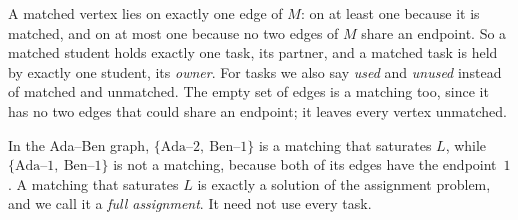 A matched vertex lies on exactly one edge of $M$: on at least one because it is matched, and on at most one because no two edges of $M$ share an endpoint. So a matched student holds exactly one task, its partner, and a matched task is held by exactly one student, its \emph{owner}. For tasks we also say \emph{used} and \emph{unused} instead of matched and unmatched. The empty set of edges is a matching too, since it has no two edges that could share an endpoint; it leaves every vertex unmatched.

In the Ada--Ben graph, $\{\text{Ada--}2,\ \text{Ben--}1\}$ is a matching that saturates $L$, while $\{\text{Ada--}1,\ \text{Ben--}1\}$ is not a matching, because both of its edges have the endpoint~$1$. A matching that saturates $L$ is exactly a solution of the assignment problem, and we call it a \emph{full assignment}. It need not use every task.
